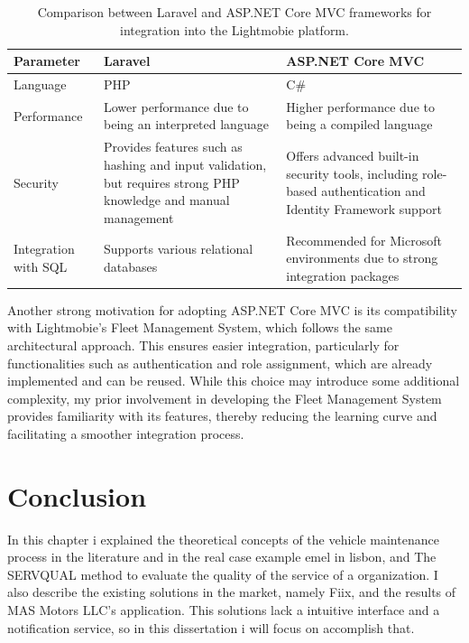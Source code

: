\begin{table}[]
\begin{tabular}{| m{5em} | m{15em} | m{15em} |}
\hline
Parameter & Laravel & ASP.NET Core MVC \\
\hline
Language & PHP & C\# \\
\hline
Performance & Lower performance due to being an interpreted language & Higher performance due to being a compiled language \\
\hline 
Security & Provides features such as hashing and input validation, but requires strong PHP knowledge and manual management & Offers advanced built-in security tools, including role-based authentication and Identity Framework support \\
\hline
Integration with SQL & Supports various relational databases & Recommended for Microsoft environments due to strong integration packages \\
\hline
\end{tabular}
\caption{Comparison between Laravel and ASP.NET Core MVC frameworks for integration into the Lightmobie platform.}
\label{table:architetcture_comparison}
\end{table}
 
Another strong motivation for adopting ASP.NET Core MVC is its compatibility with Lightmobie's Fleet Management System, which follows the same architectural approach. This ensures easier integration, particularly for functionalities such as authentication and role assignment, which are already implemented and can be reused. While this choice may introduce some additional complexity, my prior involvement in developing the Fleet Management System provides familiarity with its features, thereby reducing the learning curve and facilitating a smoother integration process.
  

\section{Conclusion}

In this chapter i explained the theoretical concepts of the vehicle maintenance process in the literature and in the real case example \ac{emel} in lisbon, and The SERVQUAL method to evaluate the quality of the service of a organization.
I also describe the existing solutions in the market, namely Fiix, and the results of MAS Motors LLC's application.
This solutions lack a intuitive interface and a notification service, so in this dissertation i will focus on accomplish that.

